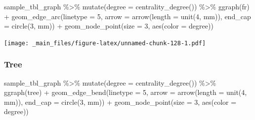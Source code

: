 \documentclass[
]{book}
\newenvironment{Shaded}{\begin{snugshade}}{\end{snugshade}}
\newcommand{\AttributeTok}[1]{\textcolor[rgb]{0.77,0.63,0.00}{#1}}
\newcommand{\DecValTok}[1]{\textcolor[rgb]{0.00,0.00,0.81}{#1}}
\newcommand{\FunctionTok}[1]{\textcolor[rgb]{0.00,0.00,0.00}{#1}}
\newcommand{\NormalTok}[1]{#1}
\newcommand{\SpecialCharTok}[1]{\textcolor[rgb]{0.00,0.00,0.00}{#1}}
\newcommand{\StringTok}[1]{\textcolor[rgb]{0.31,0.60,0.02}{#1}}
\begin{document}
\begin{Shaded}
\begin{Highlighting}[]
\NormalTok{sample\_tbl\_graph }\SpecialCharTok{\%\textgreater{}\%} 
  \FunctionTok{mutate}\NormalTok{(}\AttributeTok{degree =} \FunctionTok{centrality\_degree}\NormalTok{()) }\SpecialCharTok{\%\textgreater{}\%} 
  \FunctionTok{ggraph}\NormalTok{(}\StringTok{\textquotesingle{}fr\textquotesingle{}}\NormalTok{) }\SpecialCharTok{+} 
  \FunctionTok{geom\_edge\_arc}\NormalTok{(}\AttributeTok{linetype =} \DecValTok{5}\NormalTok{,}
                 \AttributeTok{arrow =} \FunctionTok{arrow}\NormalTok{(}\AttributeTok{length =} \FunctionTok{unit}\NormalTok{(}\DecValTok{4}\NormalTok{, }\StringTok{\textquotesingle{}mm\textquotesingle{}}\NormalTok{)), }
                   \AttributeTok{end\_cap =} \FunctionTok{circle}\NormalTok{(}\DecValTok{3}\NormalTok{, }\StringTok{\textquotesingle{}mm\textquotesingle{}}\NormalTok{)) }\SpecialCharTok{+} 
  \FunctionTok{geom\_node\_point}\NormalTok{(}\AttributeTok{size =} \DecValTok{3}\NormalTok{, }\FunctionTok{aes}\NormalTok{(}\AttributeTok{color =}\NormalTok{ degree))}
\end{Highlighting}
\end{Shaded}

\texttt{[image: \_main\_files/figure-latex/unnamed-chunk-128-1.pdf]}

\hypertarget{tree}{%
\subsubsection{Tree}\label{tree}}

\begin{Shaded}
\begin{Highlighting}[]
\NormalTok{sample\_tbl\_graph }\SpecialCharTok{\%\textgreater{}\%} 
  \FunctionTok{mutate}\NormalTok{(}\AttributeTok{degree =} \FunctionTok{centrality\_degree}\NormalTok{()) }\SpecialCharTok{\%\textgreater{}\%} 
  \FunctionTok{ggraph}\NormalTok{(}\StringTok{\textquotesingle{}tree\textquotesingle{}}\NormalTok{) }\SpecialCharTok{+} 
  \FunctionTok{geom\_edge\_bend}\NormalTok{(}\AttributeTok{linetype =} \DecValTok{5}\NormalTok{,}
                 \AttributeTok{arrow =} \FunctionTok{arrow}\NormalTok{(}\AttributeTok{length =} \FunctionTok{unit}\NormalTok{(}\DecValTok{4}\NormalTok{, }\StringTok{\textquotesingle{}mm\textquotesingle{}}\NormalTok{)), }
                   \AttributeTok{end\_cap =} \FunctionTok{circle}\NormalTok{(}\DecValTok{3}\NormalTok{, }\StringTok{\textquotesingle{}mm\textquotesingle{}}\NormalTok{)) }\SpecialCharTok{+} 
  \FunctionTok{geom\_node\_point}\NormalTok{(}\AttributeTok{size =} \DecValTok{3}\NormalTok{, }\FunctionTok{aes}\NormalTok{(}\AttributeTok{color =}\NormalTok{ degree))}
\end{Highlighting}
\end{Shaded}
\end{document}
